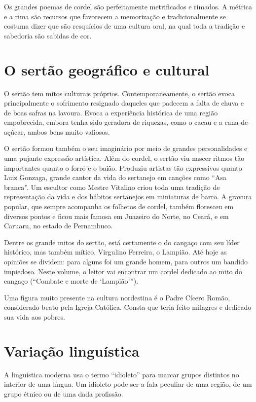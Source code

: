 Os grandes poemas de cordel são perfeitamente metrificados e rimados. A
métrica e a rima são recursos que favorecem a memorização e
tradicionalmente se costuma dizer que são resquícios de uma cultura
oral, na qual toda a tradição e sabedoria são sabidas de cor. 


\section{O sertão geográfico e cultural}

O sertão tem mitos culturais próprios. Contemporaneamente, o sertão
evoca principalmente o sofrimento resignado daqueles que padecem a
falta de chuva e de boas safras na lavoura. Evoca a experiência
histórica de uma região empobrecida, embora tenha sido geradora de
riquezas, como o cacau e a cana-de-açúcar, ambos bens muito valiosos. 

O sertão formou também o seu imaginário por meio de grandes
personalidades e uma pujante expressão artística. Além do cordel, o
sertão viu nascer ritmos tão importantes quanto o forró e o baião.
Produziu artistas tão expressivos quanto Luiz Gonzaga, grande cantor da
vida do sertanejo em canções como ``Asa
branca''. Um escultor como Mestre Vitalino criou toda
uma tradição de representação da vida e dos hábitos sertanejos em
miniaturas de barro. A gravura popular, que sempre acompanha os
folhetos de cordel, também floresceu em diversos pontos e ficou mais
famosa em Juazeiro do Norte, no Ceará, e em Caruaru, no estado de
Pernambuco. 

Dentre os grande mitos do sertão, está certamente o do cangaço com seu
líder histórico, mas também mítico, Virgulino Ferreira, o Lampião. Até
hoje as opiniões se dividem: para alguns foi um grande homem, para
outros um bandido impiedoso. Neste volume, o leitor vai encontrar 
um cordel dedicado ao mito do cangaço (``Combate e morte de `Lampião'''). 

Uma figura muito presente na cultura nordestina é o Padre Cícero Romão,
considerado beato pela Igreja Católica. Consta que teria feito milagres
e dedicado sua vida aos pobres. 

\section{Variação linguística}

A linguística moderna usa o termo
``idioleto'' para marcar grupos
distintos no interior de uma língua. Um idioleto pode ser a fala
peculiar de uma região, de um grupo étnico ou de uma dada profissão. 

